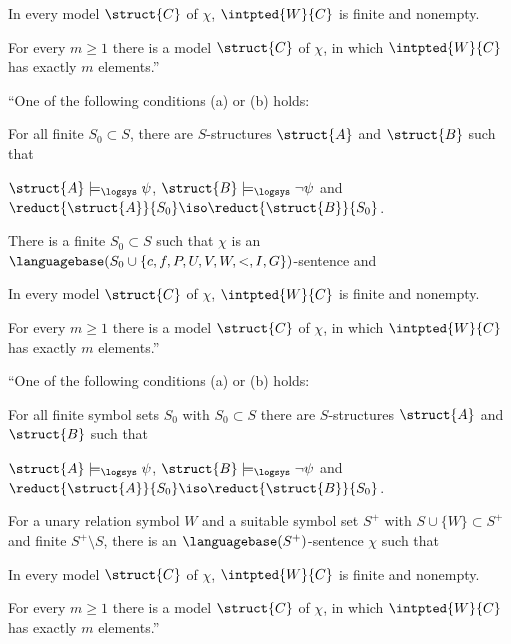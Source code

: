 \begin{enumerate}[1.]
\begin{compactenum}[(a)]
\begin{compactenum}[(i)]
\item In every model $\struct{C}$ of $\chi$, $\intpted{W}{C}$ is finite and nonempty.
\item For every $m \geq 1$ there is a model $\struct{C}$ of $\chi$, in which $\intpted{W}{C}$ has exactly $m$ elements.''
\end{compactenum}
\end{compactenum}
``One of the following conditions (a) or (b) holds:
\begin{compactenum}[(a)]
\item For all finite $S_0 \subset S$, there are $S$-structures $\struct{A}$ and $\struct{B}$ such that\smallskip\\
\centerline{$\struct{A} \models_\logsys \psi$, $\struct{B} \models_\logsys \neg\psi$ and $\reduct{\struct{A}}{S_0} \iso \reduct{\struct{B}}{S_0}$.}
\item There is a finite $S_0 \subset S$ such that $\chi$ is an $\languagebase(S_0 \cup \{ c, f, P, U, V, W, <, I, G \})$-sentence and
\begin{compactenum}[(i)]
\item In every model $\struct{C}$ of $\chi$, $\intpted{W}{C}$ is finite and nonempty.
\item For every $m \geq 1$ there is a model $\struct{C}$ of $\chi$, in which $\intpted{W}{C}$ has exactly $m$ elements.''
\end{compactenum}
\end{compactenum}
``One of the following conditions (a) or (b) holds:
\begin{compactenum}[(a)]
\item For all finite symbol sets $S_0$ with $S_0 \subset S$ there are $S$-structures $\struct{A}$ and $\struct{B}$ such that\smallskip\\
\centerline{$\struct{A} \models_\logsys \psi$, $\struct{B} \models_\logsys \neg\psi$ and $\reduct{\struct{A}}{S_0} \iso \reduct{\struct{B}}{S_0}$.}
\item For a unary relation symbol $W$ and a suitable symbol set $S^+$ with $S \cup \{W\} \subset S^+$ and finite $S^+ \setminus S$, there is an $\languagebase(S^+)$-sentence $\chi$ such that
\begin{compactenum}[(i)]
\item In every model $\struct{C}$ of $\chi$, $\intpted{W}{C}$ is finite and nonempty.
\item For every $m \geq 1$ there is a model $\struct{C}$ of $\chi$, in which $\intpted{W}{C}$ has exactly $m$ elements.''
\end{compactenum}
\end{compactenum}


\end{enumerate}
